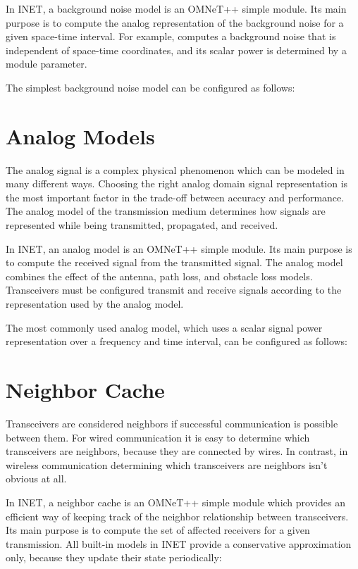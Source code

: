 In INET, a background noise model is an OMNeT++ simple module. Its main
purpose is to compute the analog representation of the background noise for
a given space-time interval. For example,
 computes a background noise that is
independent of space-time coordinates, and its scalar power is determined
by a module parameter.

The simplest background noise model can be configured as follows:


\section{Analog Models}

The analog signal is a complex physical phenomenon which can be modeled in
many different ways. Choosing the right analog domain signal representation
is the most important factor in the trade-off between accuracy and
performance. The analog model of the transmission medium determines how
signals are represented while being transmitted, propagated, and received.

In INET, an analog model is an OMNeT++ simple module. Its main purpose is
to compute the received signal from the transmitted signal. The analog
model combines the effect of the antenna, path loss, and obstacle loss
models. Transceivers must be configured transmit and receive signals
according to the representation used by the analog model.

The most commonly used analog model, which uses a scalar signal power
representation over a frequency and time interval, can be configured as
follows:


\section{Neighbor Cache}

Transceivers are considered neighbors if successful communication is
possible between them. For wired communication it is easy to determine
which transceivers are neighbors, because they are connected by wires. In
contrast, in wireless communication determining which transceivers are
neighbors isn't obvious at all.

In INET, a neighbor cache is an OMNeT++ simple module which provides
an efficient way of keeping track of the neighbor relationship between
transceivers. Its main purpose is to compute the set of affected receivers
for a given transmission. All built-in models in INET provide a
conservative approximation only, because they update their state
periodically:

